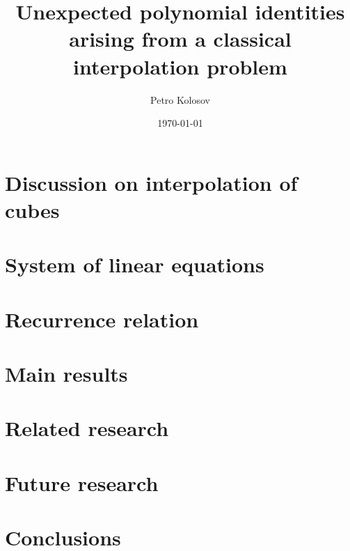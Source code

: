 \documentclass[12pt,letterpaper,oneside,reqno]{amsart}
\title[Unexpected polynomial identities arising from a class. interpolation problem]
{Unexpected polynomial identities arising from a classical interpolation problem}
\author[Petro Kolosov]{Petro Kolosov}
\date{\today}
\begin{document}
    \begin{abstract}
        
    \end{abstract}


    \maketitle

    \tableofcontents


    \section{Discussion on interpolation of cubes}
    \label{sec:the-problem-of-interpolation-of-cubes}
    


    \section{System of linear equations}
    \label{sec:system-of-linear-equations-approach}
    


    \section{Recurrence relation}
    \label{sec:recurrence-relation-approach}
    


    \section{Main results}
    \label{sec:main-results}
    


    \section{Related research}\label{sec:related-research}
    


    \section{Future research}\label{sec:future-research}
    


    \section{Conclusions}\label{sec:conclusions}
    
\end{document}
